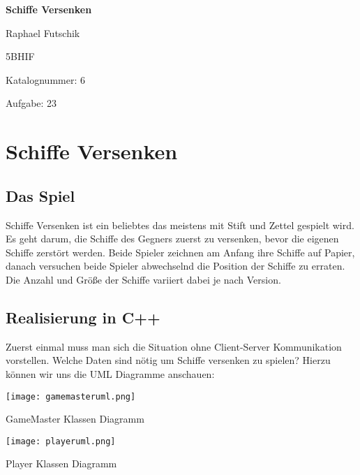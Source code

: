 \documentclass{article}
\begin{document}
\begin{titlepage}
    \begin{center}
        \vspace*{1cm}
            
        \Huge
        \textbf{Schiffe Versenken}
            
        \vspace{0.5cm}
        \LARGE
        Raphael Futschik
        
        5BHIF
        
        Katalognummer: 6
        
        Aufgabe: 23
         
        \vfill
            


            
    \end{center}
\end{titlepage}

\clearpage

\Large
\tableofcontents

\clearpage

\section{Schiffe Versenken}

\large

\subsection{Das Spiel}
Schiffe Versenken ist ein beliebtes das meistens mit Stift und Zettel gespielt wird. Es geht darum, die Schiffe des Gegners zuerst zu versenken, bevor die eigenen Schiffe zerstört werden. Beide Spieler zeichnen am Anfang ihre Schiffe auf Papier, danach versuchen beide Spieler abwechselnd die Position der Schiffe zu erraten. Die Anzahl und Größe der Schiffe variiert dabei je nach Version.


\subsection{Realisierung in C++}
Zuerst einmal muss man sich die Situation ohne Client-Server Kommunikation vorstellen. Welche Daten sind nötig um Schiffe versenken zu spielen? Hierzu können wir uns die UML Diagramme anschauen:

\centering
\texttt{[image: gamemasteruml.png]}
\caption{GameMaster Klassen Diagramm}
\centering
\texttt{[image: playeruml.png]}
\caption{Player Klassen Diagramm}
\end{document}
